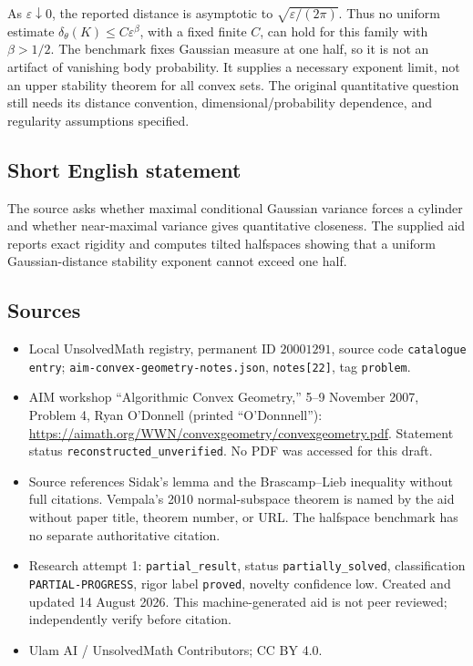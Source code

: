 \documentclass[11pt]{article}
\begin{document}
As \(\varepsilon\downarrow0\), the reported distance is asymptotic to \(\sqrt{\varepsilon/(2\pi)}\). Thus no uniform estimate \(\delta_\theta(K)\le C\varepsilon^\beta\), with a fixed finite \(C\), can hold for this family with \(\beta>1/2\). The benchmark fixes Gaussian measure at one half, so it is not an artifact of vanishing body probability. It supplies a necessary exponent limit, not an upper stability theorem for all convex sets. The original quantitative question still needs its distance convention, dimensional/probability dependence, and regularity assumptions specified.
\subsection{Short English statement}
The source asks whether maximal conditional Gaussian variance forces a cylinder and whether near-maximal variance gives quantitative closeness. The supplied aid reports exact rigidity and computes tilted halfspaces showing that a uniform Gaussian-distance stability exponent cannot exceed one half.
\subsection{Sources}
\begin{itemize}
\item Local UnsolvedMath registry, permanent ID \(20001291\), source code \texttt{catalogue entry}; \texttt{aim-convex-geometry-notes.json}, \texttt{notes[22]}, tag \texttt{problem}.
\item AIM workshop ``Algorithmic Convex Geometry,'' 5--9 November 2007, Problem 4, Ryan O'Donnell (printed ``O'Donnnell''): \url{https://aimath.org/WWN/convexgeometry/convexgeometry.pdf}. Statement status \texttt{reconstructed\_unverified}. No PDF was accessed for this draft.
\item Source references Sidak's lemma and the Brascamp--Lieb inequality without full citations. Vempala's 2010 normal-subspace theorem is named by the aid without paper title, theorem number, or URL. The halfspace benchmark has no separate authoritative citation.
\item Research attempt 1: \texttt{partial\_result}, status \texttt{partially\_solved}, classification \texttt{PARTIAL-PROGRESS}, rigor label \texttt{proved}, novelty confidence low. Created and updated 14 August 2026. This machine-generated aid is not peer reviewed; independently verify before citation.
\item Ulam AI / UnsolvedMath Contributors; CC BY 4.0.
\end{itemize}
\end{document}
